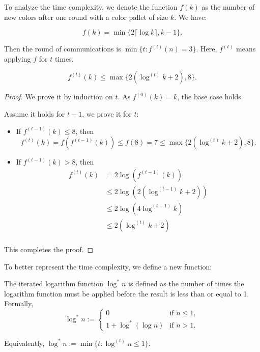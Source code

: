 To analyze the time complexity, we denote the function $f(k)$ as the number of new colors after one round with a color pallet of size $k$. We have:

\[
	f(k) = \min\{2\lceil \log k \rceil, k-1\}.
\]

Then the round of communications is $\min\{t : f^{(t)}(n) = 3\}$. Here, $f^{(t)}$ means applying $f$ for $t$ times.

\begin{lemma}
	\[
		f^{(t)}(k) \leq \max\{2(\log^{(t)} k + 2), 8\}.
	\]
\end{lemma}
\begin{proof}
	We prove it by induction on $t$. As $f^{(0)}(k) = k$, the base case holds.

	Assume it holds for $t-1$, we prove it for $t$:
	\begin{itemize}
		\item If $f^{(t-1)}(k) \leq 8$, then
		      \[
			      f^{(t)}(k) = f(f^{(t-1)}(k)) \leq f(8) = 7 \leq \max\{2(\log^{(t)} k + 2), 8\}.
		      \]
		\item If $f^{(t-1)}(k) > 8$, then
		      \begin{align*}
			      f^{(t)}(k) & = 2 \log(f^{(t-1)}(k))            \\
			                 & \leq 2\log(2(\log^{(t-1)} k + 2)) \\
			                 & \leq 2\log(4\log^{(t-1)} k)       \\
			                 & \leq 2(\log^{(t)} k + 2)          \\
		      \end{align*}
	\end{itemize}

	This completes the proof.
\end{proof}

To better represent the time complexity, we define a new function:

\begin{definition}
	The iterated logarithm function $\log^* n$ is defined as the number of times the logarithm function must be applied before the result is less than or equal to 1. Formally,
	\[
		\log^* n := \begin{cases}
			0                  & \text{if } n \leq 1, \\
			1 + \log^*(\log n) & \text{if } n > 1.
		\end{cases}
	\]

	Equivalently, $\log^* n := \min\{t : \log^{(t)} n \leq 1\}$.
\end{definition}

